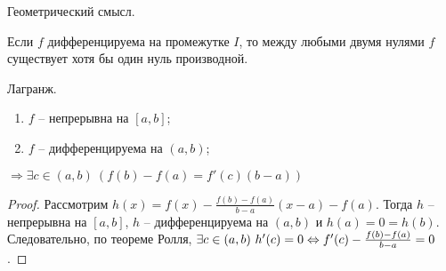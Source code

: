 \begin{note}
    Геометрический смысл.
\end{note}

\begin{center}
\end{center}

\begin{corollary}
    Если $f$ дифференцируема на промежутке $I$, то между любыми двумя нулями $f$ существует хотя бы один нуль производной.
\end{corollary}

\begin{theorem}\hypertarget{lagrange}{Лагранж.}
    \begin{enumerate}
        \item $f$ -- непрерывна на $[a,b]$;
        \item $f$ -- дифференцируема на $(a,b)$;
    \end{enumerate}
    $\Rightarrow \exists c \in (a,b) \ (f(b) - f(a) = f'(c)(b-a))$
\end{theorem}

\begin{proof}
    Рассмотрим $h(x) = f(x) - \frac{f(b) - f(a)}{b - a}(x - a) - f(a)$. Тогда $h$ -- непрерывна на $[a,b]$, $h$ -- дифференцируема на $(a,b)$ и $h(a) = 0 = h(b)$.\\
    Следовательно, по теореме Ролля, $\exists c \in (a,b) \ h'(c) = 0 \Leftrightarrow f'(c) - \frac{f(b) - f(a)}{b - a} = 0$.
\end{proof}

